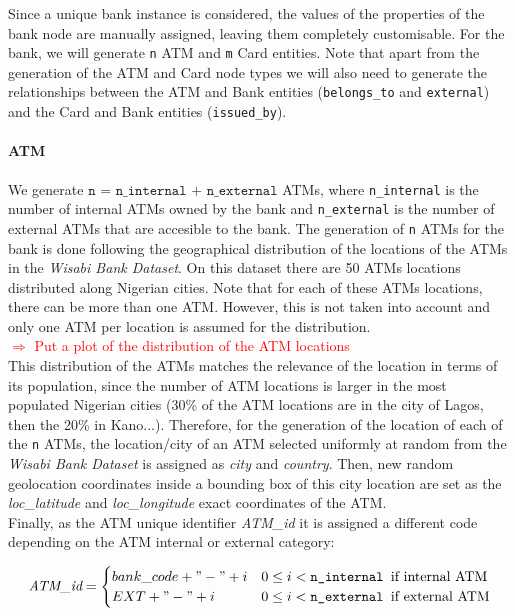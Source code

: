 \documentclass{article}
\begin{document}
Since a unique bank instance is considered, the values of the properties of the bank node are manually assigned, leaving them completely customisable.
For the bank, we will generate \texttt{n} ATM and \texttt{m} Card entities. Note that apart from the generation of the ATM and Card node types we will also need to generate the relationships between the ATM and Bank entities (\texttt{belongs\_to} and \texttt{external}) and the Card and Bank entities (\texttt{issued\_by}).

\paragraph{ATM}

We generate $\texttt{n = n\_internal + n\_external}$ ATMs, where \texttt{n\_internal} is the number of internal ATMs owned by the bank and \texttt{n\_external} is the number of external ATMs that are accesible to the bank.
The generation of \texttt{n} ATMs for the bank is done following
the geographical distribution of the locations of the ATMs in the \emph{Wisabi Bank Dataset}. 
On this dataset there are 50 ATMs locations distributed along Nigerian cities. 
Note that for each of these ATMs locations, there can be more than one ATM.
However, this is not taken into account and only one ATM per location is assumed for the 
distribution.\\
\textcolor{red}{$\Rightarrow$ Put a plot of the distribution of the ATM locations}\\
This distribution of the ATMs matches the relevance of the location in terms of its population, since the number of ATM locations is larger in the most populated 
Nigerian cities (30\% of the ATM locations are in the city of Lagos, then the 20\% in Kano...). Therefore, for the generation of the location of each of the \texttt{n} ATMs, the location/city of an ATM selected uniformly at random from the \emph{Wisabi Bank Dataset} is assigned as \emph{city} and \emph{country}. Then, new random geolocation coordinates inside a bounding box of this city location are set as the \emph{loc\_latitude} and \emph{loc\_longitude} exact coordinates of the ATM. \\
Finally, as the ATM unique identifier \emph{ATM\_id} it is assigned a different code depending on the ATM internal or external category: 

\[
\emph{ATM\_id} =
\begin{cases} 
bank\_code + "-" + i & 0 \leq i < \texttt{n\_internal } \text{if internal ATM}  \\
EXT + "-" + i & 0 \leq i < \texttt{n\_external } \text{if external ATM}
\end{cases}
\]
\end{document}
